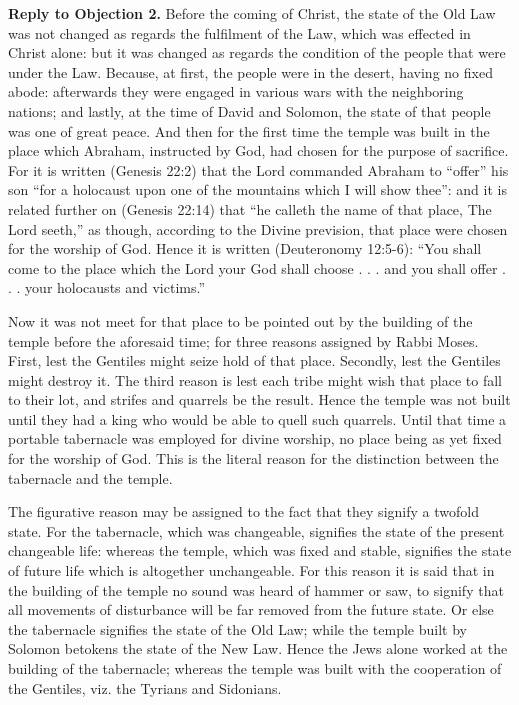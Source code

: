 \textbf{Reply to Objection 2.} Before the coming of Christ, the state of the Old Law was not changed as regards the fulfilment of the Law, which was effected in Christ alone: but it was changed as regards the condition of the people that were under the Law. Because, at first, the people were in the desert, having no fixed abode: afterwards they were engaged in various wars with the neighboring nations; and lastly, at the time of David and Solomon, the state of that people was one of great peace. And then for the first time the temple was built in the place which Abraham, instructed by God, had chosen for the purpose of sacrifice. For it is written (Genesis 22:2) that the Lord commanded Abraham to ``offer'' his son ``for a holocaust upon one of the mountains which I will show thee'': and it is related further on (Genesis 22:14) that ``he calleth the name of that place, The Lord seeth,'' as though, according to the Divine prevision, that place were chosen for the worship of God. Hence it is written (Deuteronomy 12:5-6): ``You shall come to the place which the Lord your God shall choose . . . and you shall offer . . . your holocausts and victims.''

Now it was not meet for that place to be pointed out by the building of the temple before the aforesaid time; for three reasons assigned by Rabbi Moses. First, lest the Gentiles might seize hold of that place. Secondly, lest the Gentiles might destroy it. The third reason is lest each tribe might wish that place to fall to their lot, and strifes and quarrels be the result. Hence the temple was not built until they had a king who would be able to quell such quarrels. Until that time a portable tabernacle was employed for divine worship, no place being as yet fixed for the worship of God. This is the literal reason for the distinction between the tabernacle and the temple.

The figurative reason may be assigned to the fact that they signify a twofold state. For the tabernacle, which was changeable, signifies the state of the present changeable life: whereas the temple, which was fixed and stable, signifies the state of future life which is altogether unchangeable. For this reason it is said that in the building of the temple no sound was heard of hammer or saw, to signify that all movements of disturbance will be far removed from the future state. Or else the tabernacle signifies the state of the Old Law; while the temple built by Solomon betokens the state of the New Law. Hence the Jews alone worked at the building of the tabernacle; whereas the temple was built with the cooperation of the Gentiles, viz. the Tyrians and Sidonians.

